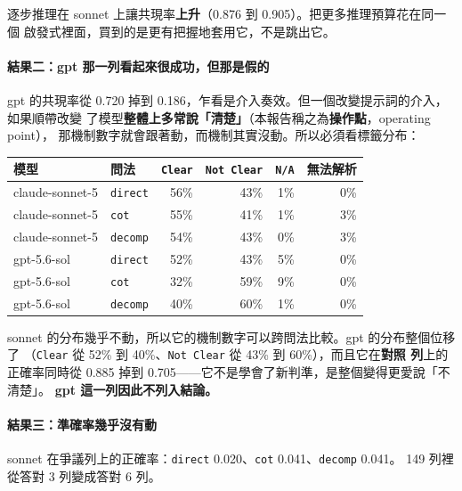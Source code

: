 \documentclass[11pt,a4paper]{ctexart}
\newcommand{\fn}[1]{\texttt{#1}}
\begin{document}
逐步推理在 sonnet 上讓共現率\textbf{上升}（0.876 到 0.905）。把更多推理預算花在同一個
啟發式裡面，買到的是更有把握地套用它，不是跳出它。

\paragraph{結果二：gpt 那一列看起來很成功，但那是假的}

gpt 的共現率從 0.720 掉到 0.186，乍看是介入奏效。但一個改變提示詞的介入，如果順帶改變
了模型\textbf{整體上多常說「清楚」}（本報告稱之為\textbf{操作點}，operating point），
那機制數字就會跟著動，而機制其實沒動。所以必須看標籤分布：

\begin{table}[h]
\centering\small
\begin{tabular}{@{}llrrrr@{}}
\toprule
模型 & 問法 & \fn{Clear} & \fn{Not Clear} & \fn{N/A} & 無法解析 \\
\midrule
claude-sonnet-5 & \fn{direct} & 56\% & 43\% & 1\% & 0\% \\
claude-sonnet-5 & \fn{cot} & 55\% & 41\% & 1\% & 3\% \\
claude-sonnet-5 & \fn{decomp} & 54\% & 43\% & 0\% & 3\% \\
\midrule
\rowcolor{gray!15}
gpt-5.6-sol & \fn{direct} & 52\% & 43\% & 5\% & 0\% \\
\rowcolor{gray!15}
gpt-5.6-sol & \fn{cot} & 32\% & 59\% & 9\% & 0\% \\
\rowcolor{gray!15}
gpt-5.6-sol & \fn{decomp} & 40\% & 60\% & 1\% & 0\% \\
\bottomrule
\end{tabular}
\end{table}

sonnet 的分布幾乎不動，所以它的機制數字可以跨問法比較。gpt 的分布整個位移了
（\fn{Clear} 從 52\% 到 40\%、\fn{Not Clear} 從 43\% 到 60\%），而且它在\textbf{對照
列}上的正確率同時從 0.885 掉到 0.705——它不是學會了新判準，是整個變得更愛說「不清楚」。
\textbf{gpt 這一列因此不列入結論。}

\paragraph{結果三：準確率幾乎沒有動}

sonnet 在爭議列上的正確率：\fn{direct} 0.020、\fn{cot} 0.041、\fn{decomp} 0.041。
149 列裡從答對 3 列變成答對 6 列。
\end{document}
